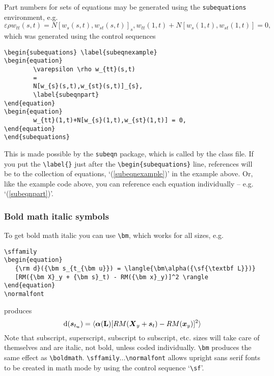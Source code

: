 \documentclass[]{tEIS2e}
\theoremstyle{plain}
\theoremstyle{remark}
\begin{document}
Part numbers for sets of equations may be generated using the
{\tt{subequations}} environment, e.g.
\begin{subequations} \label{subeqnexample}
\begin{equation}
        \varepsilon \rho w_{tt}(s,t)
        =
        N[w_{s}(s,t),w_{st}(s,t)]_{s},
        \label{subeqnpart}
\end{equation}
\begin{equation}
        w_{tt}(1,t)+N[w_{s}(1,t),w_{st}(1,t)] = 0,
\end{equation}
\end{subequations}
which was generated using the control sequences

\begin{verbatim}
\begin{subequations} \label{subeqnexample}
\begin{equation}
        \varepsilon \rho w_{tt}(s,t)
        =
        N[w_{s}(s,t),w_{st}(s,t)]_{s},
        \label{subeqnpart}
\end{equation}
\begin{equation}
        w_{tt}(1,t)+N[w_{s}(1,t),w_{st}(1,t)] = 0,
\end{equation}
\end{subequations}
\end{verbatim}
This is made possible by the {\tt{subeqn}} package, which is called
by the class file. If you put the \verb"\label{}" just after the
\verb"\begin{subequations}" line, references will be to the
collection of equations, `(\ref{subeqnexample})' in the example
above. Or, like the example code above, you can reference each
equation individually -- e.g. `(\ref{subeqnpart})'.

\subsubsection{Bold math italic symbols}

To get bold math italic you can use \verb"\bm", which works for
all sizes, e.g.
%
\begin{verbatim}
\sffamily
\begin{equation}
   {\rm d}({\bm s_{t_{\bm u}}) = \langle{\bm\alpha({\sf{\textbf L}})}
   [RM({\bm X}_y + {\bm s}_t) - RM({\bm x}_y)]^2 \rangle
\end{equation}
\normalfont
\end{verbatim}
%
produces\sffamily
\begin{equation}
   {\rm d}({\bm s_{t_{\bm u}}}) = \langle {\bm\alpha({\sf{\textbf L}})}[RM({\bm X}_y
   + {\bm s}_t) - RM({\bm x}_y)]^2 \rangle
\end{equation}\normalfont
Note that subscript, superscript, subscript to subscript, etc.
sizes will take care of themselves and are italic, not bold,
unless coded individually. \verb"\bm" produces the same effect as
\verb"\boldmath". \verb"\sffamily"...\verb"\normalfont" allows
upright sans serif fonts to be created in math mode by using the
control sequence `\verb"\sf"'.
\end{document}
